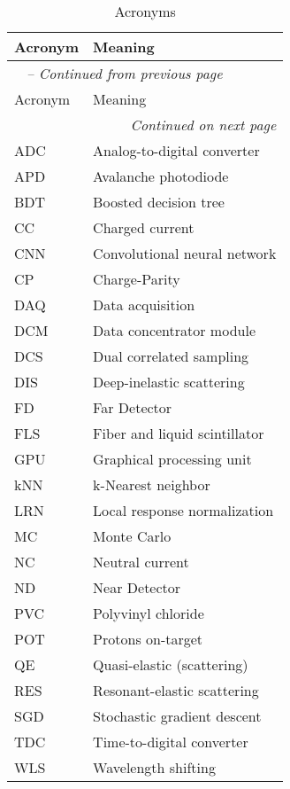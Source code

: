 \begin{longtable}{p{} p{}}
\caption{Acronyms} \label{tab:acronyms} \\

\toprule
Acronym & Meaning \\
\midrule
\endfirsthead

\multicolumn{2}{l}{\textit{\tablename\ \thetable{} -- Continued from previous page}} \\
\toprule
Acronym & Meaning \\
\midrule
\endhead

\multicolumn{2}{r}{\textit{Continued on next page}} \\
\bottomrule
\endfoot

\bottomrule
\endlastfoot
ADC & Analog-to-digital converter \\
APD & Avalanche photodiode \\
BDT & Boosted decision tree  \\
CC & Charged current \\
CNN & Convolutional neural network \\
CP & Charge-Parity \\
DAQ & Data acquisition \\
DCM & Data concentrator module \\
DCS & Dual correlated sampling \\
DIS & Deep-inelastic scattering \\
FD & Far Detector \\
FLS & Fiber and liquid scintillator \\
GPU & Graphical processing unit  \\
kNN & k-Nearest neighbor  \\
LRN & Local response normalization \\
MC & Monte Carlo \\
NC & Neutral current \\
ND & Near Detector \\
PVC & Polyvinyl chloride \\
POT & Protons on-target \\
QE & Quasi-elastic (scattering) \\
RES & Resonant-elastic scattering \\
SGD & Stochastic gradient descent \\
TDC & Time-to-digital converter  \\
WLS & Wavelength shifting \\
\end{longtable}
